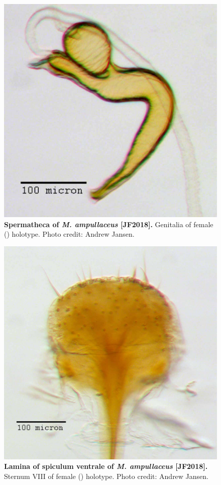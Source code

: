 \documentclass[fleqn,10pt,lineno]{wlpeerj} %
\begin{document}
\begin{figure}[h]
	\centering
	\includegraphics[width=\textwidth]{figure12.jpg}
	\caption{\textbf{Spermatheca of \textit{M. ampullaceus} [JF2018].} Genitalia of female (\female) holotype. Photo credit: Andrew Jansen.}
	\label{fig:ampullaceus_spermatheca}
\end{figure}

\begin{figure}[h]
	\centering
	\includegraphics[width=\textwidth]{figure13.jpg}
	\caption{\textbf{Lamina of spiculum ventrale of \textit{M. ampullaceus} [JF2018].} Sternum VIII of female (\female) holotype. Photo credit: Andrew Jansen.}
	\label{fig:ampullaceus_lamina}
\end{figure}
\end{document}
